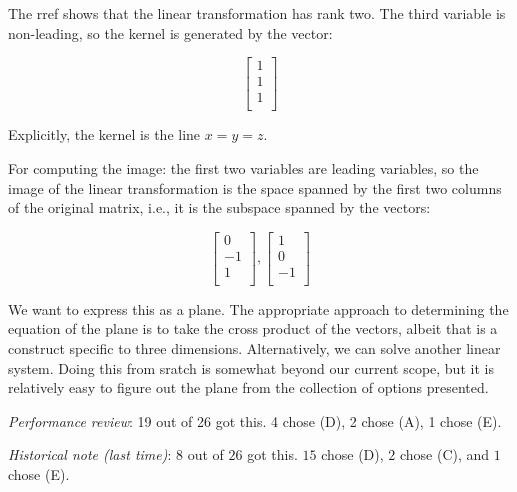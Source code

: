 \documentclass[10pt]{amsart}
\begin{document}
\begin{enumerate}
  The rref shows that the linear transformation has rank two. The
  third variable is non-leading, so the kernel is generated by the vector:

  $$\left[\begin{matrix} 1 \\ 1 \\ 1 \\\end{matrix}\right]$$

  Explicitly, the kernel is the line $x = y = z$.

  For computing the image: the first two variables are leading
  variables, so the image of the linear transformation is the space
  spanned by the first two columns of the original matrix, i.e., it is
  the subspace spanned by the vectors:

  $$\left[\begin{matrix} 0 \\ -1 \\ 1 \\\end{matrix}\right], \left[\begin{matrix} 1 \\ 0 \\ -1\\\end{matrix}\right]$$

  We want to express this as a plane. The appropriate approach to
  determining the equation of the plane is to take the cross product
  of the vectors, albeit that is a construct specific to three
  dimensions. Alternatively, we can solve another linear system. Doing
  this from sratch is somewhat beyond our current scope, but it is
  relatively easy to figure out the plane from the collection of
  options presented.

  {\em Performance review}: 19 out of 26 got this. 4 chose (D), 2
  chose (A), 1 chose (E).

  {\em Historical note (last time)}: $8$ out of $26$ got this. $15$ chose (D),
  $2$ chose (C), and $1$ chose (E).

\end{enumerate}
\end{document}
